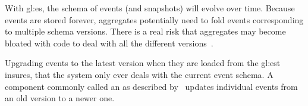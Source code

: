 
With \gls{gl:es}, the schema of events (and snapshots) will evolve over time. Because events are stored forever, aggregates potentially need to fold events corresponding to multiple schema versions. There is a real risk that aggregates may become
bloated with code to deal with all the different versions~\citep{richardson2018microservices}. 

Upgrading events to the latest version when they are loaded from the \gls{gl:est} insures, that the system only ever deals with the current event schema. A component commonly called an  as described by~\citep{richardson2018microservices} updates individual events from an old version to a newer one.



